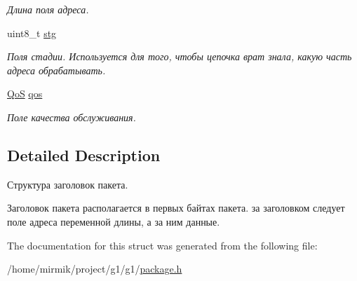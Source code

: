 \begin{DoxyCompactItemize}
\begin{DoxyCompactList}\small\item\em Длина поля адреса. \end{DoxyCompactList}\item 
uint8\+\_\+t \hyperlink{structg1_1_1package__header_ade59c95e617ca8789a408c9aaa0ab088}{stg}\hypertarget{structg1_1_1package__header_ade59c95e617ca8789a408c9aaa0ab088}{}\label{structg1_1_1package__header_ade59c95e617ca8789a408c9aaa0ab088}

\begin{DoxyCompactList}\small\item\em Поля стадии. Используется для того, чтобы цепочка врат знала, какую часть адреса обрабатывать. \end{DoxyCompactList}\item 
\hyperlink{package_8h_a157fb77f1b8142697dc1b88efaae6a0a}{QoS} \hyperlink{structg1_1_1package__header_aea47ad75b2af7d91d1f460ff5887c751}{qos}\hypertarget{structg1_1_1package__header_aea47ad75b2af7d91d1f460ff5887c751}{}\label{structg1_1_1package__header_aea47ad75b2af7d91d1f460ff5887c751}

\begin{DoxyCompactList}\small\item\em Поле качества обслуживания. \end{DoxyCompactList}\end{DoxyCompactItemize}


\subsection{Detailed Description}
Структура заголовок пакета. 

Заголовок пакета располагается в первых байтах пакета. за заголовком следует поле адреса переменной длины, а за ним данные. 

The documentation for this struct was generated from the following file\+:\begin{DoxyCompactItemize}
\item 
/home/mirmik/project/g1/g1/\hyperlink{package_8h}{package.\+h}\end{DoxyCompactItemize}

